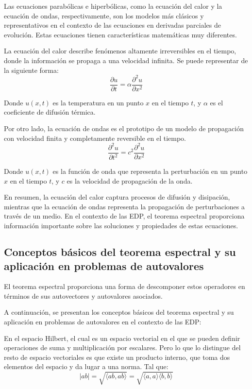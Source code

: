 \documentclass{article}
\begin{document}
    Las ecuaciones parabólicas e hiperbólicas, como la ecuación del calor y la ecuación de ondas, respectivamente, son los modelos más clásicos y representativos en el contexto de las ecuaciones en derivadas parciales de evolución. Estas ecuaciones tienen características matemáticas muy diferentes. 

    La ecuación del calor describe fenómenos altamente irreversibles en el tiempo, donde la información se propaga a una velocidad infinita. Se puede representar de la siguiente forma:
    \begin{equation}
        \frac{\partial u}{\partial t} = \alpha \frac{\partial^2 u}{\partial x^2}
        \end{equation}
    
        Donde $u(x,t)$ es la temperatura en un punto $x$ en el tiempo $t$, y $\alpha$ es el coeficiente de difusión térmica.

    Por otro lado, la ecuación de ondas es el prototipo de un modelo de propagación con velocidad finita y completamente reversible en el tiempo.
    \begin{equation}
        \frac{\partial^2 u}{\partial t^2} = c^2 \frac{\partial^2 u}{\partial x^2}
        \end{equation}
        
        Donde $u(x,t)$ es la función de onda que representa la perturbación en un punto $x$ en el tiempo $t$, y $c$ es la velocidad de propagación de la onda.



    En resumen, la ecuación del calor captura procesos de difusión y disipación, mientras que la ecuación de ondas representa la propagación de perturbaciones a través de un medio. En el contexto de las EDP, el teorema espectral proporciona información importante sobre las soluciones y propiedades de estas ecuaciones.
    \subsection{Conceptos básicos del teorema espectral y su aplicación en problemas de autovalores}

    El teorema espectral proporciona una forma de descomponer estos operadores en términos de sus autovectores y autovalores asociados.

    A continuación, se presentan los conceptos básicos del teorema espectral y su aplicación en problemas de autovalores en el contexto de las EDP:

    En el espacio Hilbert, el cual es un espacio vectorial en el que se pueden definir operaciones de suma y multiplicación por escalares. Pero lo que lo distingue del resto de espacio vectoriales es que existe un producto interno, que toma dos elementos del espacio y da lugar a una norma. Tal que:
    \begin{equation}
        |ab| = \sqrt{\langle ab, ab \rangle} = \sqrt{\langle a,a \rangle \langle b,b \rangle}
        \end{equation}
        
\end{document}
